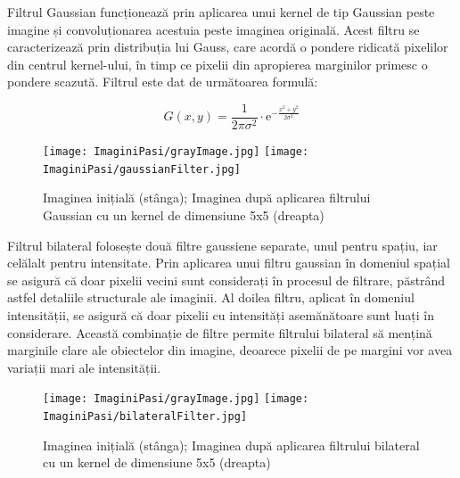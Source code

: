 \documentclass[12pt]{article}
\begin{document}
Filtrul Gaussian funcționeaz\u{a} prin aplicarea unui kernel de tip Gaussian peste imagine și convoluționarea acestuia peste imaginea original\u{a}. Acest filtru se caracterizeaz\u{a} prin distribuția lui Gauss, care acord\u{a} o pondere ridicat\u{a} pixelilor din centrul kernel-ului, \^{i}n timp ce pixelii din apropierea marginilor primesc o pondere scazut\u{a}. Filtrul este dat de urm\u{a}toarea formul\u{a}:

\begin{equation}
    G(x,y) = \frac{1}{2\pi\sigma^2} \cdot \mathrm{e}^{-\frac{x^2+y^2}{2\sigma^2}}
\end{equation}

\begin{figure}[H]
  \centering
  \texttt{[image: ImaginiPasi/grayImage.jpg]}\hfill
  \texttt{[image: ImaginiPasi/gaussianFilter.jpg]}
  \caption{Imaginea inițial\u{a} (st\^{a}nga); Imaginea dup\u{a} aplicarea filtrului Gaussian cu un kernel de dimensiune 5x5 (dreapta)}
  \label{fig:filtrul_gaussian}
\end{figure}

Filtrul bilateral folosește dou\u{a} filtre gaussiene separate, unul pentru spațiu, iar cel\u{a}lalt pentru intensitate. Prin aplicarea unui filtru gaussian \^{i}n domeniul spațial se asigur\u{a} c\u{a} doar pixelii vecini sunt considerați \^{i}n procesul de filtrare, p\u{a}str\^{a}nd astfel detaliile structurale ale imaginii. Al doilea filtru, aplicat \^{i}n domeniul intensit\u{a}ții, se asigur\u{a} c\u{a} doar pixelii cu intensit\u{a}ți asem\u{a}n\u{a}toare sunt luați \^{i}n considerare. Aceast\u{a} combinație de filtre permite filtrului bilateral s\u{a} mențin\u{a} marginile clare ale obiectelor din imagine, deoarece pixelii de pe margini vor avea variații mari ale intensit\u{a}ții.

\begin{figure}[H]
  \centering
  \texttt{[image: ImaginiPasi/grayImage.jpg]}\hfill
  \texttt{[image: ImaginiPasi/bilateralFilter.jpg]}
  \caption{Imaginea inițial\u{a} (st\^{a}nga); Imaginea dup\u{a} aplicarea filtrului bilateral cu un kernel de dimensiune 5x5 (dreapta)}
  \label{fig:filtrul_bilateral}
\end{figure}
\end{document}
